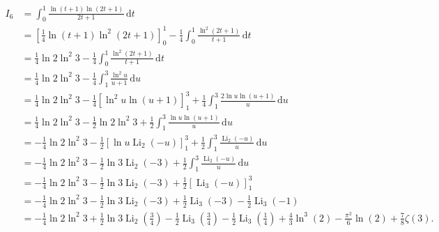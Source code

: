 \begin{align}
I_{6}
&=\int_{0}^{1}\frac{\ln{(t+1)}\ln{(2t+1)}}{2t+1}\,\mathrm{d}t\\
&=\left[\frac14\ln{(t+1)}\ln^2{(2t+1)}\right]_{0}^{1}-\frac14\int_{0}^{1}\frac{\ln^2{(2t+1)}}{t+1}\,\mathrm{d}t\\
&=\frac14\ln{2}\ln^2{3}-\frac14\int_{0}^{1}\frac{\ln^2{(2t+1)}}{t+1}\,\mathrm{d}t\\
&=\frac14\ln{2}\ln^2{3}-\frac14\int_{1}^{3}\frac{\ln^2{u}}{u+1}\,\mathrm{d}u\\
&=\frac14\ln{2}\ln^2{3}-\frac14\left[\ln^2{u}\ln{(u+1)}\right]_{1}^{3}+\frac14\int_{1}^{3}\frac{2\ln{u}\ln{(u+1)}}{u}\,\mathrm{d}u\\
&=\frac14\ln{2}\ln^2{3}-\frac12\ln{2}\ln^2{3}+\frac12\int_{1}^{3}\frac{\ln{u}\ln{(u+1)}}{u}\,\mathrm{d}u\\
&=-\frac14\ln{2}\ln^2{3}-\frac12\left[\ln{u}\operatorname{Li}_2{\left(-u\right)}\right]_{1}^{3}+\frac12\int_{1}^{3}\frac{\operatorname{Li}_2{\left(-u\right)}}{u}\,\mathrm{d}u\\
&=-\frac14\ln{2}\ln^2{3}-\frac12\ln{3}\operatorname{Li}_2{\left(-3\right)}+\frac12\int_{1}^{3}\frac{\operatorname{Li}_2{\left(-u\right)}}{u}\,\mathrm{d}u\\
&=-\frac14\ln{2}\ln^2{3}-\frac12\ln{3}\operatorname{Li}_2{\left(-3\right)}+\frac12\left[\operatorname{Li}_3{\left(-u\right)}\right]_{1}^{3}\\
&=-\frac14\ln{2}\ln^2{3}-\frac12\ln{3}\operatorname{Li}_2{\left(-3\right)}+\frac12\operatorname{Li}_3{\left(-3\right)}-\frac12\operatorname{Li}_3{\left(-1\right)}\\
&=-\frac14\ln{2}\ln^2{3}+\frac12\ln{3}\operatorname{Li}_2{\left(\frac34\right)} -\frac12\operatorname{Li}_3{\left(\frac{3}{4}\right)}-\frac12\operatorname{Li}_3{\left(\frac{1}{4}\right)}+\frac43\ln^3{(2)}-\frac{\pi^2}{6}\ln{(2)}+\frac78\zeta{(3)}.
\end{align}